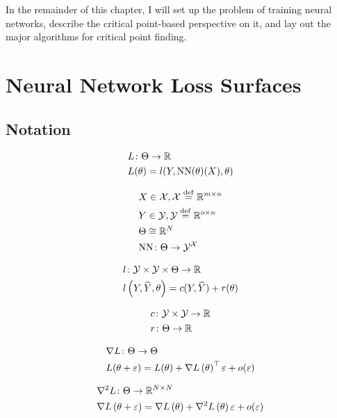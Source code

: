\documentclass[../../thesis.tex]{subfiles}
\begin{document}
In the remainder of this chapter,
I will set up the problem of training neural networks,
describe the critical point-based perspective on it,
and lay out the major algorithms for critical point finding.

\section{Neural Network Loss Surfaces}

\subsection{Notation}

\begin{align}
	&L\from \Theta \to \R\\
	&L(\theta) = l(Y, \mathrm{NN}(\theta)(X), \theta)\equationlabel{loss}
\end{align}

\begin{align}
	&X \in {\mathcal{X}}, {\mathcal{X}} \stackrel{\small \mathrm{def}}{=} \mathbb{R}^{m\times n} \\
	&Y \in {\mathcal{Y}}, {\mathcal{Y}} \stackrel{\small \mathrm{def}}{=} \mathbb{R}^{o\times n} \\
	&\Theta \cong \mathbb{R}^{N} \\
	&\mathrm{NN}\colon \Theta \to {\mathcal{Y}}^{\mathcal{X}}
\end{align}

\begin{align}
	&l\from \cY \times \cY \times \Theta \to \R\\
	&l\left(Y, \hat{Y}, \theta\right) = c(Y, \hat{Y}) + r(\theta)\equationlabel{full-loss}
\end{align}

\begin{align}
	&c\colon {\mathcal{Y}} \times {\mathcal{Y}} \to \mathbb{R}\\
	&r\colon \Theta \to \mathbb{R}
\end{align}

\begin{align}
	&\nabla{L}\colon \Theta \to \Theta\\
	&L(\theta + \varepsilon) = L(\theta) + \nabla L\left(\theta\right)^\top\varepsilon + o(\varepsilon)
\end{align}

\begin{align}
	&\nabla^2{L}\colon \Theta \to \mathbb{R}^{N\times N}\\
	&\nabla L\left(\theta + \varepsilon\right) = \nabla L\left(\theta\right) + \nabla^2L\left(\theta\right)\varepsilon + o(\varepsilon)
\end{align}
\end{document}

